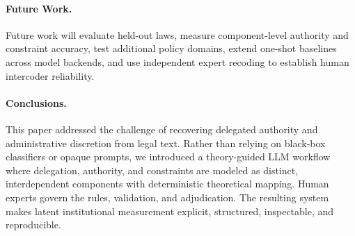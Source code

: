 \documentclass[runningheads]{llncs}
\begin{document}
\paragraph{Future Work.} Future work will evaluate held-out laws, measure component-level authority and constraint accuracy, test additional policy domains, extend one-shot baselines across model backends, and use independent expert recoding to establish human intercoder reliability.
\vspace{-0.2cm}
\paragraph{Conclusions.} This paper addressed the challenge of recovering delegated authority and administrative discretion from legal text. Rather than relying on black-box classifiers or opaque prompts, we introduced a theory-guided LLM workflow where delegation, authority, and constraints are modeled as distinct, interdependent components with deterministic theoretical mapping. Human experts govern the rules, validation, and adjudication. The resulting system makes latent institutional measurement explicit, structured, inspectable, and reproducible.




\vspace{-0.2cm}

\vspace{-0.2cm}
\end{document}
